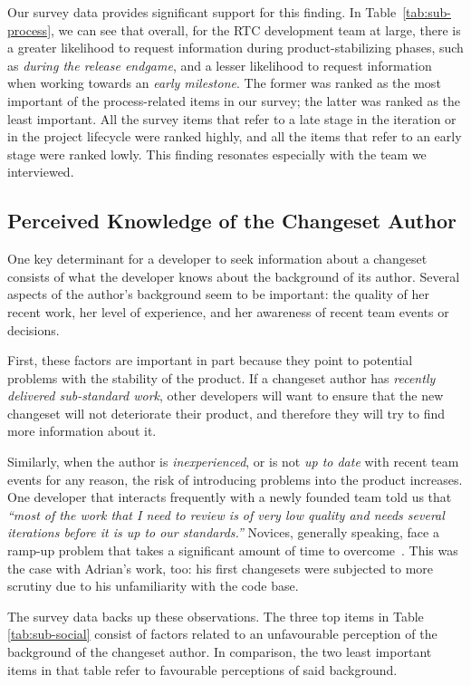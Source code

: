 Our survey data provides significant support for this finding. In Table~\ref{tab:sub-process}, we can see that overall, for the RTC development team at large, there is a greater likelihood to request information during product-stabilizing phases, such as 
\emph{during the release endgame}, and a lesser likelihood to request information when working towards an \emph{early milestone}. The former was ranked as the most important of the process-related items in our survey; the latter was ranked as the least important. All the survey items that refer to a late stage in the iteration or in the project lifecycle were ranked highly, and all the items that refer to an early stage were ranked lowly. This finding resonates especially with the team we interviewed. 


\subsection{Perceived Knowledge of the Changeset Author}
One key determinant for a developer to seek information about a changeset consists of what the developer knows about the background of its author. Several aspects of the author's background seem to be important: the quality of her recent work, her level of experience, and her awareness of recent team events or decisions.

First, these factors are important in part because they point to potential problems with the stability of the product. If a changeset author has \emph{recently delivered sub-standard work}, other developers will want to ensure that the new changeset will not deteriorate their product, and therefore they will try to find more information about it.

Similarly, when the author is \emph{inexperienced}, or is not \emph{up to date} with recent team events for any reason, the risk of introducing problems into the product increases. One developer that interacts frequently with a newly founded team told us that \emph{``most of the work that I need to review is of very low quality and needs several iterations before it is up to our standards.''} Novices, generally speaking, face a ramp-up problem that takes a significant amount of time to overcome~\cite{begel:sigcse:2008}. This was the case with Adrian's work, too: his first changesets were subjected to more scrutiny due to his unfamiliarity with the code base.

The survey data backs up these observations. The three top items in Table \ref{tab:sub-social} consist of factors related to an unfavourable perception of the background of the changeset author. In comparison, the two least important items in that table refer to favourable perceptions of said background.

